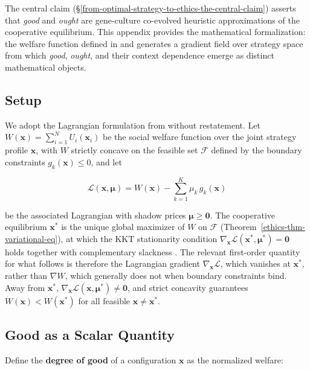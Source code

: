 \documentclass[11pt]{article}
\theoremstyle{plain}
\theoremstyle{definition}
\theoremstyle{remark}
\let\origsubsection\subsection
\renewcommand{\subsection}{\needspace{7\baselineskip}\origsubsection}
\begin{document}
The central claim
(§\ref{from-optimal-strategy-to-ethics-the-central-claim}) asserts that
\emph{good} and \emph{ought} are gene-culture co-evolved heuristic
approximations of the cooperative equilibrium. This appendix provides
the mathematical formalization: the welfare function defined in
\citep{TC-I} and \citep{TC-V} generates a gradient field over strategy
space from which \emph{good}, \emph{ought}, and their context dependence
emerge as distinct mathematical objects.

\subsection{Setup}\label{setup}

We adopt the Lagrangian formulation from \citep{TC-I} without
restatement. Let \(W(\mathbf{x}) = \sum_{i=1}^{N} U_i(\mathbf{x}_i)\) be
the social welfare function over the joint strategy profile
\(\mathbf{x}\), with \(W\) strictly concave on the feasible set
\(\mathcal{F}\) defined by the boundary constraints
\(g_k(\mathbf{x}) \leq 0\), and let

\[\mathcal{L}(\mathbf{x}, \boldsymbol{\mu}) = W(\mathbf{x}) - \sum_{k=1}^{K} \mu_k\, g_k(\mathbf{x})\]

be the associated Lagrangian with shadow prices
\(\boldsymbol{\mu} \geq \mathbf{0}\). The cooperative equilibrium
\(\mathbf{x}^*\) is the unique global maximizer of \(W\) on
\(\mathcal{F}\) (Theorem~\ref{ethics-thm-variational-eq}), at which the
KKT stationarity condition
\(\nabla_{\mathbf{x}} \mathcal{L}(\mathbf{x}^*, \boldsymbol{\mu}^*) = \mathbf{0}\)
holds together with complementary slackness \citep{TC-I}. The relevant
first-order quantity for what follows is therefore the Lagrangian
gradient \(\nabla_{\mathbf{x}} \mathcal{L}\), which vanishes at
\(\mathbf{x}^*\), rather than \(\nabla W\), which generally does not
when boundary constraints bind. Away from \(\mathbf{x}^*\),
\(\nabla_{\mathbf{x}} \mathcal{L}(\mathbf{x}, \boldsymbol{\mu}^*) \neq \mathbf{0}\),
and strict concavity guarantees \(W(\mathbf{x}) < W(\mathbf{x}^*)\) for
all feasible \(\mathbf{x} \neq \mathbf{x}^*\).

\subsection{Good as a Scalar Quantity}\label{good-as-a-scalar-quantity}

Define the \textbf{degree of good} of a configuration \(\mathbf{x}\) as
the normalized welfare:
\end{document}
